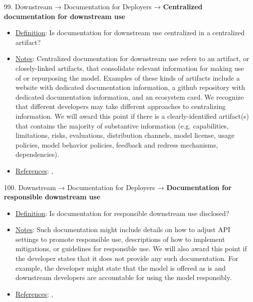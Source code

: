 99. Downstream → Documentation for Deployers → \textbf{Centralized documentation for downstream use}
\vspace{-\parskip}
\begin{itemize}
\item
\underline{Definition}: Is documentation for downstream use centralized in a centralized artifact?
\item
\underline{Notes}: Centralized documentation for downstream use refers to an artifact, or closely-linked artifacts, that consolidate relevant information for making use of or repurposing the model. Examples of these kinds of artifacts include a website with dedicated documentation information, a github repository with dedicated documentation information, and an ecosystem card. We recognize that different developers may take different approaches to centralizing information. We will award this point if there is a clearly-identified artifact(s) that contains the majority of substantive information (e.g. capabilities, limitations, risks, evaluations, distribution channels, model license, usage policies, model behavior policies, feedback and redress mechanisms, dependencies).
\item
\underline{References}: \citet{gebru2021datasheets}, \citet{mitchell2019model}
\end{itemize} \vspace{\baselineskip}


100. Downstream → Documentation for Deployers → \textbf{Documentation for responsible downstream use}
\vspace{-\parskip}
\begin{itemize}
\item
\underline{Definition}: Is documentation for responsible downstream use disclosed?
\item
\underline{Notes}: Such documentation might include details on how to adjust API settings to promote responsible use, descriptions of how to implement mitigations, or guidelines for responsible use. We will also award this point if the developer states that it does not provide any such documentation. For example, the developer might state that the model is offered as is and downstream developers are accountable for using the model responsibly.
\item
\underline{References}: \citet{bommasani2023ecosystem}, \citet{brown2023allocating}
\end{itemize} \vspace{\baselineskip}


\clearpage